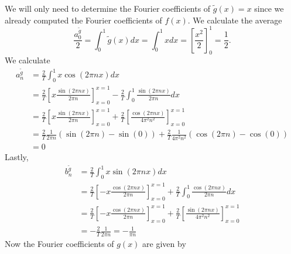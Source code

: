 \documentclass[11pt]{article}
\begin{document}
\begin{solution}
\begin{itemize}
        We will only need to determine the Fourier coefficients of $\tilde{g}(x) = x$ since we already computed the Fourier coefficients of $f(x)$. 
        We calculate the average 
        \[
            \frac{a_0^{\tilde g}}{2} = \int_{0}^{1} \tilde{g}(x) dx  = \int_{0}^{1} x dx  = \left[ \frac{x^2}{2} \right]_{0}^{1} = \frac 1 2.
        \]
        We calculate 
        \begin{align*}
            a_n^{\tilde g} 
            &
            = 
            \frac{2}{T}
            \int_{0}^{1} x \cos(2\pi n x) dx
            \\&
            =
            \frac{2}{T}
            \left[ x \frac{ \sin(2\pi n x) }{ 2\pi n } \right]_{x=0}^{x=1}
            -
            \frac{2}{T}
            \int_{0}^{1} \frac{ \sin(2\pi n x) }{ 2\pi n } dx
            \\&
            =
            \frac{2}{T}
            \left[ x \frac{ \sin(2\pi n x) }{ 2\pi n } \right]_{x=0}^{x=1}
            +
            \frac{2}{T}
            \left[ \frac{ \cos(2\pi n x) }{ 4\pi^2 n^2 } \right]_{x=0}^{x=1}
            \\&
            =
            \frac{2}{T}
            \frac{1}{2\pi n}
            \left( \sin(2\pi n) - \sin(0) \right)
            +
            \frac{2}{T}
            \frac{1}{ 4\pi^2 n^2 }
            \left( \cos(2\pi n) - \cos(0) \right)
            \\&
            =
            0
        \end{align*}	
        Lastly, 
        \begin{align*}
            b_n^{\tilde g} 
            &
            = 
            \frac{2}{T}
            \int_{0}^{1} x \sin(2\pi n x) dx
            \\&
            =
            \frac{2}{T}
            \left[- x \frac{ \cos(2\pi n x) }{ 2\pi n } \right]_{x=0}^{x=1}
            +
            \frac{2}{T}
            \int_{0}^{1} \frac{ \cos(2\pi n x) }{ 2\pi n } dx
            \\&
            =
           \frac{2}{T}
            \left[- x \frac{ \cos(2\pi n x) }{ 2\pi n } \right]_{x=0}^{x=1}
            +
            \frac{2}{T}
            \left[ \frac{ \sin(2\pi n x) }{ 4\pi^2 n^2 } \right]_{x=0}^{x=1}
            \\&
            = 
            -\frac{2}{T}\frac{1}{2\pi n} =  -\frac{1}{\pi n} 
        \end{align*}	
        Now the Fourier coefficients of $g(x)$ are given by
                \begin{align*}

\end{align*}
\end{itemize}
\end{solution}
\end{document}
